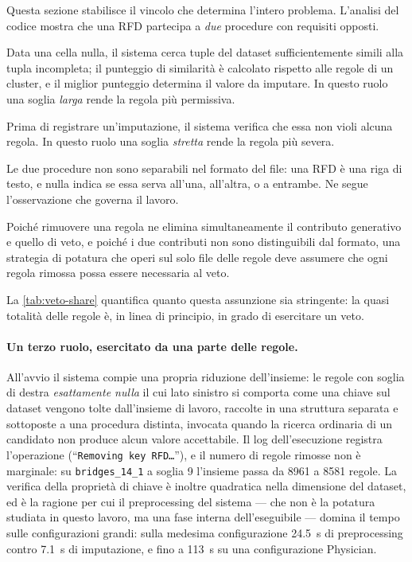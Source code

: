 Questa sezione stabilisce il vincolo che determina l'intero problema. L'analisi del codice mostra
che una RFD partecipa a \emph{due} procedure con requisiti opposti.

\begin{description}[leftmargin=0em]
    \item[Ruolo generativo.] Data una cella nulla, il sistema cerca tuple del dataset
    sufficientemente simili alla tupla incompleta; il punteggio di similarità è calcolato
    rispetto alle regole di un cluster, e il miglior punteggio determina il valore da imputare.
    In questo ruolo una soglia \emph{larga} rende la regola più permissiva.

    \item[Ruolo di veto.] Prima di registrare un'imputazione, il sistema verifica che essa non
    violi alcuna regola. In questo ruolo una soglia \emph{stretta} rende la regola più severa.
\end{description}

Le due procedure non sono separabili nel formato del file: una RFD è una riga di testo, e nulla
indica se essa serva all'una, all'altra, o a entrambe. Ne segue l'osservazione che governa il
lavoro.

\begin{observation}\label{obs:conservative}
Poiché rimuovere una regola ne elimina simultaneamente il contributo generativo e quello di veto,
e poiché i due contributi non sono distinguibili dal formato, una strategia di potatura che operi
sul solo file delle regole deve assumere che ogni regola rimossa possa essere necessaria al veto.
\end{observation}

La \autoref{tab:veto-share} quantifica quanto questa assunzione sia stringente: la quasi totalità
delle regole è, in linea di principio, in grado di esercitare un veto.

\paragraph{Un terzo ruolo, esercitato da una parte delle regole.} All'avvio il sistema compie una
propria riduzione dell'insieme: le regole con soglia di destra \emph{esattamente nulla} il cui lato
sinistro si comporta come una chiave sul dataset vengono tolte dall'insieme di lavoro, raccolte in
una struttura separata e sottoposte a una procedura distinta, invocata quando la ricerca ordinaria
di un candidato non produce alcun valore accettabile. Il log dell'esecuzione registra l'operazione
(``\texttt{Removing key RFD\ldots}''), e il numero di regole rimosse non è marginale: su
\texttt{bridges\_14\_1} a soglia 9 l'insieme passa da \num{8961} a \num{8581} regole. La verifica
della proprietà di chiave è inoltre quadratica nella dimensione del dataset, ed è la ragione per
cui il preprocessing del sistema --- che non è la potatura studiata in questo lavoro, ma una fase
interna dell'eseguibile --- domina il tempo sulle configurazioni grandi: sulla medesima
configurazione \SI{24.5}{\second} di preprocessing contro \SI{7.1}{\second} di imputazione, e fino
a \SI{113}{\second} su una configurazione Physician.

